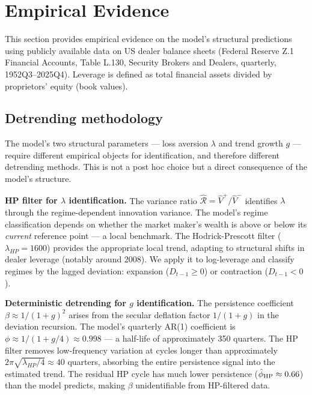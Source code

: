 \documentclass[12pt,a4paper]{article}
\theoremstyle{definition}
\begin{document}

\section{Empirical Evidence}
\label{sec:empirical}

This section provides empirical evidence on the model's structural
predictions using publicly available data on US dealer balance sheets
(Federal Reserve Z.1 Financial Accounts, Table L.130, Security Brokers
and Dealers, quarterly, 1952Q3--2025Q4). Leverage is defined as total
financial assets divided by proprietors' equity (book values).

\subsection{Detrending methodology}
\label{sec:detrending}

The model's two structural parameters --- loss aversion $\lambda$ and
trend growth $g$ --- require different empirical objects for
identification, and therefore different detrending methods. This is not
a post hoc choice but a direct consequence of the model's structure.

\noindent\textbf{HP filter for $\lambda$ identification.} The variance
ratio $\hat{\mathcal{R}} = \hat{V}^+/\hat{V}^-$ identifies $\lambda$
through the regime-dependent innovation variance. The model's regime
classification depends on whether the market maker's wealth is above or
below its \emph{current} reference point --- a local benchmark. The
Hodrick-Prescott filter ($\lambda_{HP} = 1600$) provides the
appropriate local trend, adapting to structural shifts in dealer
leverage (notably around 2008). We apply it to log-leverage and classify
regimes by the lagged deviation: expansion ($D_{t-1} \geq 0$) or
contraction ($D_{t-1} < 0$).

\noindent\textbf{Deterministic detrending for $g$ identification.} The
persistence coefficient $\beta \approx 1/(1+g)^2$ arises from the
secular deflation factor $1/(1+g)$ in the deviation recursion. The
model's quarterly AR(1) coefficient is $\phi \approx 1/(1+g/4) \approx
0.998$ --- a half-life of approximately 350 quarters. The HP filter
removes low-frequency variation at cycles longer than approximately
$2\pi\sqrt{\lambda_{HP}/4} \approx 40$ quarters, absorbing the entire
persistence signal into the estimated trend. The residual HP cycle has
much lower persistence ($\hat{\phi}_{\rm HP} \approx 0.66$) than the
model predicts, making $\beta$ unidentifiable from HP-filtered data.
\end{document}
